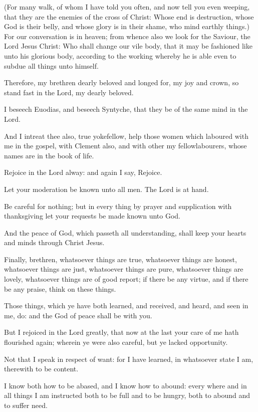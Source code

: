\Verse (For many walk, of whom I have told you often, and now tell you even weeping, that they are the enemies of the cross of Christ: \Verse Whose end is destruction, whose God is their belly, and whose glory is in their shame, who mind earthly things.)  \Verse For our conversation is in heaven; from whence also we look for the Saviour, the Lord Jesus Christ: \Verse Who shall change our vile body, that it may be fashioned like unto his glorious body, according to the working whereby he is able even to subdue all things unto himself.


\Chapter
\Verse Therefore, my brethren dearly beloved and longed for, my joy and crown, so stand fast in the Lord, my dearly beloved.

\Verse I beseech Euodias, and beseech Syntyche, that they be of the same mind in the Lord.

\Verse And I intreat thee also, true yokefellow, help those women which laboured with me in the gospel, with Clement also, and with other my fellowlabourers, whose names are in the book of life.

\Verse Rejoice in the Lord alway: and again I say, Rejoice.

\Verse Let your moderation be known unto all men. The Lord is at hand.

\Verse Be careful for nothing; but in every thing by prayer and supplication with thanksgiving let your requests be made known unto God.

\Verse And the peace of God, which passeth all understanding, shall keep your hearts and minds through Christ Jesus.

\Verse Finally, brethren, whatsoever things are true, whatsoever things are honest, whatsoever things are just, whatsoever things are pure, whatsoever things are lovely, whatsoever things are of good report; if there be any virtue, and if there be any praise, think on these things.

\Verse Those things, which ye have both learned, and received, and heard, and seen in me, do: and the God of peace shall be with you.

\Verse But I rejoiced in the Lord greatly, that now at the last your care of me hath flourished again; wherein ye were also careful, but ye lacked opportunity.

\Verse Not that I speak in respect of want: for I have learned, in whatsoever state I am, therewith to be content.

\Verse I know both how to be abased, and I know how to abound: every where and in all things I am instructed both to be full and to be hungry, both to abound and to suffer need.


